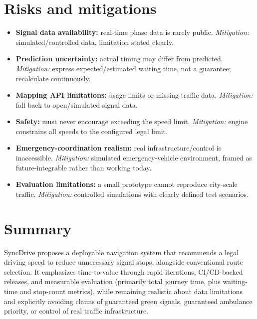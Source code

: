 \documentclass[11pt,a4paper]{article}
\begin{document}
\section{Risks and mitigations}
\begin{itemize}[leftmargin=0.7cm]
    \item \textbf{Signal data availability:} real-time phase data is rarely public. \emph{Mitigation:} simulated/controlled data, limitation stated clearly.
    \item \textbf{Prediction uncertainty:} actual timing may differ from predicted. \emph{Mitigation:} express expected/estimated waiting time, not a guarantee; recalculate continuously.
    \item \textbf{Mapping API limitations:} usage limits or missing traffic data. \emph{Mitigation:} fall back to open/simulated signal data.
    \item \textbf{Safety:} must never encourage exceeding the speed limit. \emph{Mitigation:} engine constrains all speeds to the configured legal limit.
    \item \textbf{Emergency-coordination realism:} real infrastructure/control is inaccessible. \emph{Mitigation:} simulated emergency-vehicle environment, framed as future-integrable rather than working today.
    \item \textbf{Evaluation limitations:} a small prototype cannot reproduce city-scale traffic. \emph{Mitigation:} controlled simulations with clearly defined test scenarios.
\end{itemize}

\section{Summary}
SyncDrive proposes a deployable navigation system that recommends a legal driving speed to reduce unnecessary signal stops, alongside conventional route selection. It emphasizes time-to-value through rapid iterations, CI/CD-backed releases, and measurable evaluation (primarily total journey time, plus waiting-time and stop-count metrics), while remaining realistic about data limitations and explicitly avoiding claims of guaranteed green signals, guaranteed ambulance priority, or control of real traffic infrastructure.
\end{document}
